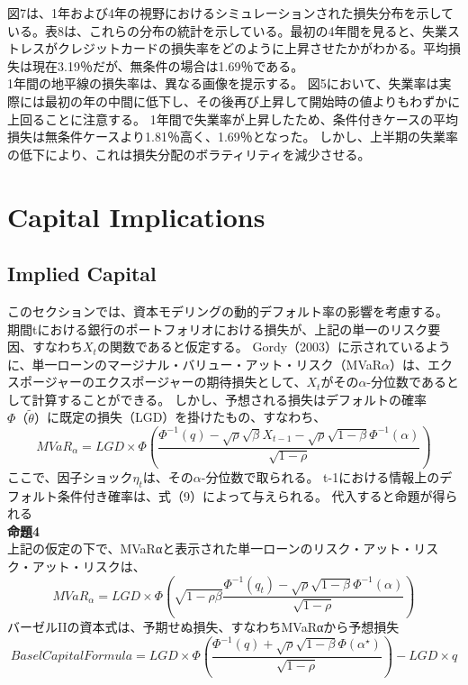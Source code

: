 \documentclass[a4j,12pt]{jarticle}
\begin{document}
図7は、1年および4年の視野におけるシミュレーションされた損失分布を示している。表8は、これらの分布の統計を示している。最初の4年間を見ると、失業ストレスがクレジットカードの損失率をどのように上昇させたかがわかる。平均損失は現在3.19％だが、無条件の場合は1.69％である。\\
1年間の地平線の損失率は、異なる画像を提示する。 図5において、失業率は実際には最初の年の中間に低下し、その後再び上昇して開始時の値よりもわずかに上回ることに注意する。 1年間で失業率が上昇したため、条件付きケースの平均損失は無条件ケースより1.81％高く、1.69％となった。 しかし、上半期の失業率の低下により、これは損失分配のボラティリティを減少させる。
\section{Capital Implications}
\subsection{Implied Capital}
このセクションでは、資本モデリングの動的デフォルト率の影響を考慮する。 期間tにおける銀行のポートフォリオにおける損失が、上記の単一のリスク要因、すなわち$X_t$の関数であると仮定する。 Gordy（2003）に示されているように、単一ローンのマージナル・バリュー・アット・リスク（MVaR$\alpha$）は、エクスポージャーのエクスポージャーの期待損失として、$X_t$がその$\alpha$-分位数であるとして計算することができる。 しかし、予想される損失はデフォルトの確率$\Phi（\tilde{\theta}）$に既定の損失（LGD）を掛けたもの、すなわち、
\begin{equation}
MVaR_{\alpha} = LGD \times \Phi(\frac{\Phi^{-1}(q)-\sqrt{\rho}\sqrt{\beta}X_{t-1}-\sqrt{\rho}\sqrt{1-\beta}\Phi^{-1}(\alpha)}{\sqrt{1-\rho}})
\end{equation}
ここで、因子ショック$\eta_t$は、その$\alpha$-分位数で取られる。
t-1における情報上のデフォルト条件付き確率は、式（9）によって与えられる。 代入すると命題が得られる\\
{\bf 命題4}\\
上記の仮定の下で、MVaRαと表示された単一ローンのリスク・アット・リスク・アット・リスクは、
\begin{equation}
MVaR_\alpha = LGD \times \Phi(\sqrt{1-\rho\beta}\frac{\Phi^{-1}(q_t)-\sqrt{\rho}\sqrt{1-\beta}\Phi^{-1}(\alpha)}{\sqrt{1-\rho}})
\end{equation}
バーゼルIIの資本式は、予期せぬ損失、すなわちMVaRαから予想損失
\begin{equation}
Basel Capital Formula = LGD \times \Phi(\frac{\Phi^{-1}(q) + \sqrt{\rho}\sqrt{1-\beta}\Phi(\alpha^{\star})}{\sqrt{1-\rho}})-LGD\times q
\end{equation}
\end{document}
